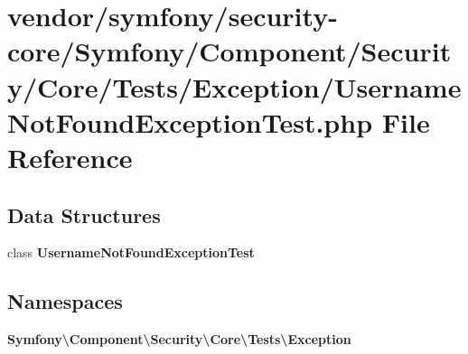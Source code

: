 \section{vendor/symfony/security-\/core/\+Symfony/\+Component/\+Security/\+Core/\+Tests/\+Exception/\+Username\+Not\+Found\+Exception\+Test.php File Reference}
\label{_username_not_found_exception_test_8php}
\subsection*{Data Structures}
\begin{DoxyCompactItemize}
\item 
class {\bf Username\+Not\+Found\+Exception\+Test}
\end{DoxyCompactItemize}
\subsection*{Namespaces}
\begin{DoxyCompactItemize}
\item 
 {\bf Symfony\textbackslash{}\+Component\textbackslash{}\+Security\textbackslash{}\+Core\textbackslash{}\+Tests\textbackslash{}\+Exception}
\end{DoxyCompactItemize}
